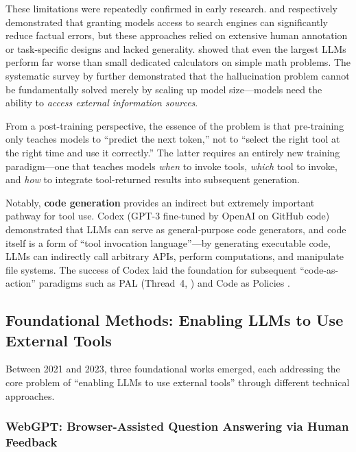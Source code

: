 These limitations were repeatedly confirmed in early research. \citet{komeili2022internet} and \citet{thoppilan2022lamda} respectively demonstrated that granting models access to search engines can significantly reduce factual errors, but these approaches relied on extensive human annotation or task-specific designs and lacked generality. \citet{patel2021nlp} showed that even the largest LLMs perform far worse than small dedicated calculators on simple math problems. The systematic survey by \citet{ji2022hallucination} further demonstrated that the hallucination problem cannot be fundamentally solved merely by scaling up model size---models need the ability to \emph{access external information sources}.

From a post-training perspective, the essence of the problem is that pre-training only teaches models to ``predict the next token,'' not to ``select the right tool at the right time and use it correctly.'' The latter requires an entirely new training paradigm---one that teaches models \emph{when} to invoke tools, \emph{which} tool to invoke, and \emph{how} to integrate tool-returned results into subsequent generation.

Notably, \textbf{code generation} provides an indirect but extremely important pathway for tool use.
Codex \cite{chen2021codex} (GPT-3 fine-tuned by OpenAI on GitHub code)
demonstrated that LLMs can serve as general-purpose code generators,
and code itself is a form of ``tool invocation language''---by generating executable code,
LLMs can indirectly call arbitrary APIs, perform computations, and manipulate file systems.
The success of Codex laid the foundation for subsequent ``code-as-action'' paradigms
such as PAL \cite{gao2022pal} (Thread~4, )
and Code as Policies \cite{liang2023codepolicies}.


\subsection{Foundational Methods: Enabling LLMs to Use External Tools}
\label{sec:t6-foundation}

Between 2021 and 2023, three foundational works emerged, each addressing the core problem of ``enabling LLMs to use external tools'' through different technical approaches.

\subsubsection{WebGPT: Browser-Assisted Question Answering via Human Feedback}

